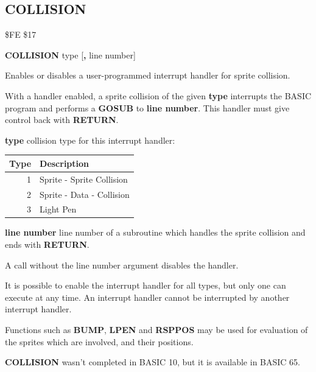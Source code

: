 \subsection{COLLISION}
\begin{description}[leftmargin=2cm,style=nextline]
\item [Token:]   \$FE \$17

\item [Format:]  {\bf COLLISION} type [{\bf,} line number]

\item [Usage:]   Enables or disables a user-programmed interrupt handler for sprite collision.

                 With a handler enabled, a sprite collision of the given {\bf type} interrupts the BASIC program and performs a {\bf GOSUB} to {\bf line number}. This handler must give control back with {\bf RETURN}.

                 {\bf type} collision type for this interrupt handler:
                 \begin{center}
                 \begin{tabular}{|r|l|}
                 \hline
                 {\bf Type} & {\bf Description}\\
                 \hline
                 1	& 	Sprite - Sprite Collision \\
                 2	& 	Sprite - Data - Collision \\
                 3	& 	Light Pen \\
                 \hline
                 \end{tabular}
                 \end{center}

                 {\bf line number} line number of a subroutine which handles the sprite collision and ends with {\bf RETURN}.

                 A call without the line number argument disables the handler.

\item [Remarks:] It is possible to enable the interrupt handler for all types, but only one can execute at any time. An interrupt handler cannot be interrupted by another interrupt handler.

                 Functions such as {\bf BUMP}, {\bf LPEN} and {\bf RSPPOS} may be used for evaluation of the sprites which are involved, and their positions.

                 {\bf COLLISION} wasn't completed in BASIC 10, but it is available in BASIC 65.


\end{description}
